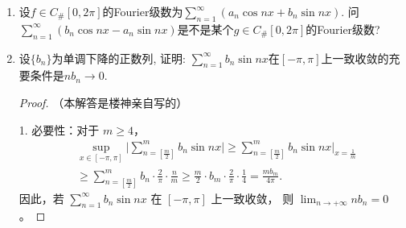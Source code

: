 \begin{quizb}
\begin{enumerate}
\begin{proof}[解答]
\[    =\lim_{x\to0^+}x\sum_{n=1}^{\infty}\frac{\sin nx}{(nx)^\alpha}\ 
    {\color{blue}=}\int_0^\infty\frac{\sin t}{t^\alpha}\,\dd t,\]
    这个积分由Dirichlet判别法收敛，从而$f(x) \sim x^{1-\alpha}$。
    剩下的任务就是论证蓝色的等号成立，毕竟反常积分用切成无穷多段求和来算涉及交换极限，
    并不天然成立；那么下面说明$L\to\infty$时
    \[x\sum_{n\geqslant\lceil L/x \rceil}\frac{\sin nx}{(nx)^\alpha}\to0\tag{$\blacklozenge$}\]
    且收敛速度和$x$有多小无关，此式化无穷区间的切割为固定的区间$[0,L]$的切割，这时
    \[\lim_{x\to0^+}x\sum_{n<\lceil L/x \rceil}\frac{\sin nx}{(nx)^\alpha}
    =\int_0^L\frac{\sin t}{t^\alpha}\,\dd t\]
    是成立的，由于$(\blacklozenge)$确保了$L\to\infty$时上式左边趋于蓝色等号的左边，
    两边令$L\to\infty$即完成了本题。为了证明$(\blacklozenge)$，记
    \[S_n=\sin x+\cdots+\sin nx=\frac{\cos\frac{(n+1)x}{2}-\cos\frac{x}{2}}{\sin\frac{x}{2}},\]
    则\[\left|\sum_{n\geqslant N}\frac{\sin nx}{n^\alpha}\right|
    =\left|\sum_{n \geqslant N}\frac{S_n-S_{n-1}}{n^\alpha}\right|
    =\left|-\frac{S_{N-1}}{N^\alpha}+\sum_{n \geqslant N}S_n\left(\frac{1}{n^\alpha}-\frac{1}{(n+1)^\alpha}\right)\right|
    \leqslant\frac{4}{N^\alpha\sin\frac{x}{2}},\]
    从而$L\to\infty$时
    \[x\sum_{n\geqslant\lceil L/x \rceil}\frac{\sin nx}{(nx)^\alpha}
    \leqslant\frac{4x}{\left(\lceil L/x\rceil x\right)^\alpha\sin\frac{x}{2}}
    \leqslant\frac{4\pi}{\left.L\right.^{\!\alpha}}\to0.\qedhere\]
\end{proof}
\item 设\(f\in C_{\#}[0,2\pi]\)的Fourier级数为\(\sum_{n=1}^{\infty}\left(a_n\cos nx+b_n\sin nx\right)\). 问\(\sum_{n=1}^{\infty}\left(b_n\cos nx-a_n\sin nx\right)\)是不是某个\(g\in C_{\#}[0,2\pi]\)的Fourier级数?
\item 设\(\{b_n\}\)为单调下降的正数列, 证明: \(\sum_{n=1}^{\infty}b_n\sin nx\)在\([-\pi,\pi]\)上一致收敛的充要条件是\(nb_n\rightarrow 0\).
\begin{proof}
（本解答是楼神亲自写的）

1. 必要性：对于 $m \geqslant 4$，
\begin{align*}
& \sup_{x \in[-\pi, \pi]}\Bigg|\sum_{n=\left[\frac{m}{2}\right]}^m b_n \sin n x\Bigg| 
\geqslant\sum_{n=\left[\frac{m}{2}\right]}^m b_n \sin n x\Bigg|_{x=\frac{1}{m}} \\
& \geqslant \sum_{n=\left[\frac{m}{2}\right]}^m b_n \cdot \frac{2}{\pi} \cdot \frac{n}{m} 
\geqslant \frac{m}{2} \cdot b_m \cdot \frac{2}{\pi} \cdot \frac{1}{4}=\frac{m b_m}{4 \pi}.
\end{align*}
因此，若 \(\sum_{n=1}^{\infty} b_n \sin n x\) 在 $[-\pi, \pi]$ 上一致收敛，
则 \(\lim_{n \rightarrow+\infty} n b_n=0\)。


\end{proof}
\end{enumerate}
\end{quizb}
